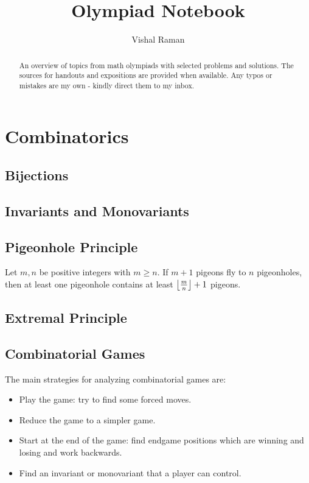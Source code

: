 \documentclass[11pt]{article}
\renewcommand{\>}{\rangle}
\newcommand{\<}{\langle}
\begin{document}
\title{Olympiad Notebook}
\author{Vishal Raman}
\maketitle
\begin{abstract}
An overview of topics from math olympiads with selected problems and solutions.  The sources for handouts and expositions are provided when available.  Any typos or mistakes are my own - kindly direct them to my inbox.  
\end{abstract}
\tableofcontents
\pagebreak
\section{Combinatorics}
\subsection{Bijections}

\subsection{Invariants and Monovariants}

\subsection{Pigeonhole Principle}
\begin{theorem} Let $m, n$ be positive integers with $m \ge n$.  If $m+1$ pigeons fly to $n$ pigeonholes, then at least one pigeonhole contains at least $\left\lfloor \frac{m}{n} \right\rfloor + 1$ pigeons.
\end{theorem}
\subsection{Extremal Principle}
\subsection{Combinatorial Games}
The main strategies for analyzing combinatorial games are:
\begin{itemize}
\item Play the game: try to find some forced moves.
\item Reduce the game to a simpler game.
\item Start at the end of the game: find endgame positions which are winning and losing and work backwards.
\item Find an invariant or monovariant that a player can control.  
\end{itemize}
\end{document}
